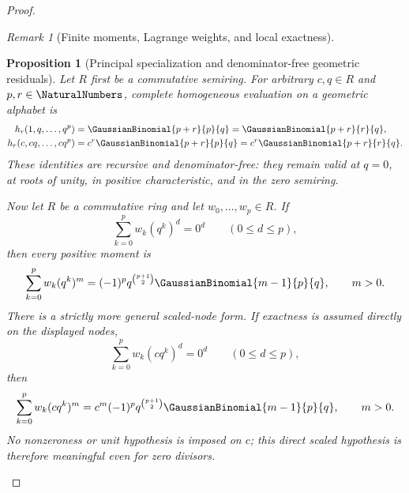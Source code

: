 \documentclass[11pt,oneside]{article}
\newtheorem{proposition}[theorem]{Proposition}
\theoremstyle{definition}
\theoremstyle{remark}
\newtheorem{remark}[theorem]{Remark}
\begin{document}
\begin{proof}
\begin{remark}[Finite moments, Lagrange weights, and local exactness]
\begin{proposition}[Principal specialization and denominator-free geometric residuals]
\label{prop:geometric-principal-residuals}
Let $R$ first be a commutative semiring.  For arbitrary $c,q\in R$ and
$p,r\in\NaturalNumbers$, complete homogeneous evaluation on a geometric alphabet is
\begin{align}
 h_r(1,q,\ldots,q^p)
   &=\GaussianBinomial{p+r}{p}{q}=\GaussianBinomial{p+r}{r}{q},              \label{eq:complete-homogeneous-geometric}\\
 h_r(c,cq,\ldots,cq^p)
   &=c^r\GaussianBinomial{p+r}{p}{q}=c^r\GaussianBinomial{p+r}{r}{q}.        \label{eq:complete-homogeneous-scaled-geometric}
\end{align}
These identities are recursive and denominator-free: they remain valid at
$q=0$, at roots of unity, in positive characteristic, and in the zero
semiring.

Now let $R$ be a commutative ring and let $w_0,\ldots,w_p\in R$.  If
\begin{equation}
 \sum_{k=0}^{p}w_k(q^k)^d=0^d\qquad(0\le d\le p),        \label{eq:geometric-exact-row-hypothesis}
\end{equation}
then every positive moment is
\begin{equation}
 \sum_{k=0}^{p}w_k(q^k)^m
 =(-1)^p q^{\binom{p+1}{2}}\GaussianBinomial{m-1}{p}{q},
 \qquad m>0.                                             \label{eq:geometric-exact-row-all-moments}
\end{equation}
There is a strictly more general scaled-node form.  If exactness is assumed
directly on the displayed nodes,
\begin{equation}
 \sum_{k=0}^{p}w_k(cq^k)^d=0^d\qquad(0\le d\le p),       \label{eq:scaled-geometric-exact-row-hypothesis}
\end{equation}
then
\begin{equation}
 \sum_{k=0}^{p}w_k(cq^k)^m
 =c^m(-1)^p q^{\binom{p+1}{2}}\GaussianBinomial{m-1}{p}{q},
 \qquad m>0.                                             \label{eq:scaled-geometric-exact-row-all-moments}
\end{equation}
No nonzeroness or unit hypothesis is imposed on $c$; this direct scaled
hypothesis is therefore meaningful even for zero divisors.


\end{proposition}
\end{remark}
\end{proof}
\end{document}
